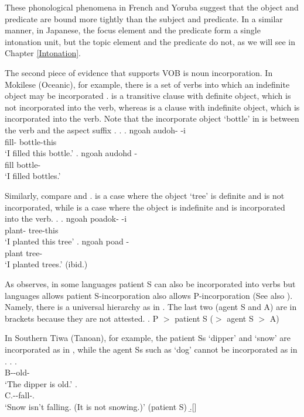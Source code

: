 These phonological phenomena in French and Yoruba suggest that
the object and predicate are bound more tightly than the subject and predicate.
In a similar manner,
in Japanese,
the focus element and the predicate form a single intonation unit,
but the topic element and the predicate do not,
as we will see in Chapter \ref{Intonation}.

The second piece of evidence that supports VOB is noun incorporation.
In Mokilese (Oceanic), for example,
there is a set of verbs into which an indefinite object may be incorporated \cite[from][]{harrison76}.
\Next[a] is a transitive clause with definite object,
which is not incorporated into the verb,
whereas \Next[b] is a clause with indefinite object,
which is incorporated into the verb.
Note that the incorporate object  `bottle' in \Next[b] is between the verb and the aspect suffix .
%
\ex.
 \ag. ngoah audoh- -i \\
		 fill- bottle-this \\
		`I filled this bottle.'
 \bg. ngoah audohd - \\
		 fill bottle- \\
		`I filled bottles.'
		\hfill{\cite[162]{harrison76}}

Similarly,
compare \Next[a] and \Next[b].
\Next[a] is a case where the object  `tree' is definite and is not incorporated,
while \Next[b] is a case where the object is indefinite and is incorporated into the verb.
\ex.
 \ag. ngoah poadok- -i \\
 	 plant- tree-this \\
	`I planted this tree'
 \bg. ngoah poad - \\
 	 plant tree- \\
	`I planted trees.'
	\hfill{(ibid.)}

As  observes,
in some languages patient S can also be incorporated into verbs
but languages allows patient S-incorporation also allows P-incorporation (See also ).%
Namely, there is a universal hierarchy as in \Next.
The last two (agent S and A) are in brackets because
they are not attested.
%
\ex. \label{NIhierarchy}P $>$ patient S ($>$ agent S $>$ A)

In Southern Tiwa (Tanoan), for example,
the patient Ss `dipper' and `snow' are incorporated as in \Next,
while the agent Ss such as `dog' cannot be incorporated as in \NNext.
	\ex. \ag.  \\
			{\sc B}--old- \\
			`The dipper is old.'
		\bg.  \\
			{\sc C}.--fall-. \\
			`Snow isn't falling. (It is not snowing.)'  \hfill{(patient S)}
		\b.[] \hfill{\cite{allenetal84,baker88}}
	
